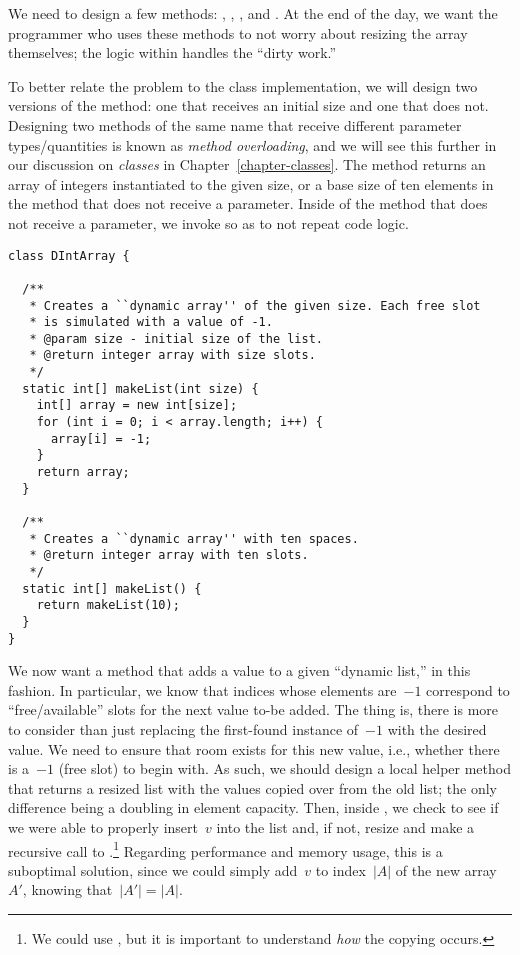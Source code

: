 We need to design a few methods: , , , and . 
At the end of the day, we want the programmer who uses these methods to not worry about resizing the array themselves; the logic within handles the ``dirty work.''

To better relate the problem to the  class implementation, we will design two versions of the  method: one that receives an initial size and one that does not. 
Designing two methods of the same name that receive different parameter types/quantities is known as \emph{method overloading}, and we will see this further in our discussion on \emph{classes} in Chapter~\ref{chapter-classes}. 
The  method returns an array of integers instantiated to the given size, or a base size of ten elements in the method that does not receive a parameter. 
Inside of the  method that does not receive a parameter, we invoke  so as to not repeat code logic.

\begin{lstlisting}[language=MyJava]
class DIntArray {

  /**
   * Creates a ``dynamic array'' of the given size. Each free slot
   * is simulated with a value of -1.
   * @param size - initial size of the list.
   * @return integer array with size slots.
   */
  static int[] makeList(int size) {
    int[] array = new int[size];
    for (int i = 0; i < array.length; i++) {
      array[i] = -1;
    }
    return array;
  }

  /**
   * Creates a ``dynamic array'' with ten spaces.
   * @return integer array with ten slots.
   */
  static int[] makeList() {
    return makeList(10);
  }
}
\end{lstlisting}

We now want a method that adds a value to a given ``dynamic list,'' in this fashion. 
In particular, we know that indices whose elements are~$-1$ correspond to ``free/available'' slots for the next value to-be added. 
The thing is, there is more to consider than just replacing the first-found instance of~$-1$ with the desired value. 
We need to ensure that room exists for this new value, i.e., whether there is a~$-1$ (free slot) to begin with. 
As such, we should design a local helper method that returns a resized list with the values copied over from the old list; the only difference being a doubling in element capacity. 
Then, inside , we check to see if we were able to properly insert~$v$ into the list and, if not, resize and make a recursive call to .\footnote{We could use , but it is important to understand \emph{how} the copying occurs.} 
Regarding performance and memory usage, this is a suboptimal solution, since we could simply add~$v$ to index~$|A|$ of the new array~$A'$, knowing that~$|A'| = |A|$.

